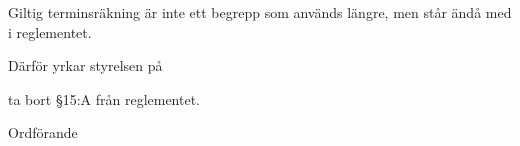 \documentclass[../_main/handlingar.tex]{subfiles}
\begin{document}

Giltig terminsräkning är inte ett begrepp som används längre, men står ändå med i reglementet.

Därför yrkar styrelsen på

\begin{attsatser}
    \att ta bort \S15:A från reglementet.
\end{attsatser}

\begin{signatures}{1}
    \ist
    \signature{\ordf}{Ordförande}
\end{signatures}
\end{document}
